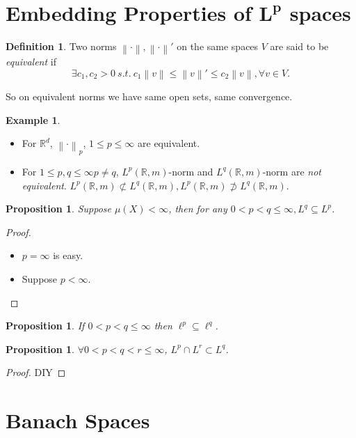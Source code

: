 \documentclass{report}
\newcommand{\R}{\mathbb{R}}
\newcommand{\st}{\ s.t.\ }
\newcommand{\norm}[1]{\left\| #1 \right\|}
\newtheorem{proposition}[theorem]{Proposition}
\theoremstyle{definition}
\newtheorem{definition}[theorem]{Definition}
\newtheorem{example}[theorem]{Example}
\theoremstyle{remark}
\newcommand{\fnl}{\parbox[t]{0\linewidth}{}}
\newcommand*\ttlmath[2]{\texorpdfstring{$\boldsymbol{#1}$}{#2}}
\begin{document}
\section{Embedding Properties of \ttlmath{L^p}{L\^p} spaces}
\begin{definition}
	Two norms $\norm{\cdot}, \norm{\cdot}'$ on the same spaces $V$ are said to be \emph{equivalent} if \[\exists c_1, c_2 > 0 \st c_1\norm{v} \leq \norm{v}' \leq c_2 \norm{v}, \forall v \in V.\]
\end{definition}
So on equivalent norms we have same open sets, same convergence.
\begin{example} \fnl
	\begin{itemize}
		\item For $\R^d$, $\norm{\cdot}_p$, $1 \leq p \leq \infty$ are equivalent.
		\item For $1 \leq p, q \leq \infty p \neq q$, $L^p(\R, m)$-norm and $L^q(\R, m)$-norm are \emph{not equivalent}. $L^p(\R, m) \not\subset L^q(\R, m), L^p(\R, m) \not\supset L^q(\R, m)$.
	\end{itemize}
\end{example}

\begin{proposition}
	Suppose $\mu(X) < \infty$, then for any $0 < p < q \leq \infty, L^q \subseteq L^p$.
\end{proposition}
\begin{proof}
	\begin{itemize}
		\item $p = \infty$ is easy.
		\item Suppose $p < \infty$.
	\end{itemize}
\end{proof}

\begin{proposition}
	If $0 < p < q \leq \infty$ then $\ell^p \subseteq \ell^q$.
\end{proposition}


\begin{proposition}
	$\forall 0 < p < q < r \leq \infty$, $L^p \cap L^r \subset L^q$.
\end{proposition}
\begin{proof}
	DIY
\end{proof}

\section{Banach Spaces}
\end{document}
